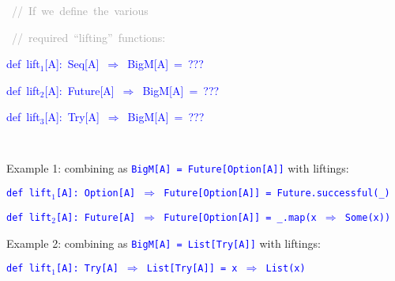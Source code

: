 \begin{minipage}[t]{0.49\columnwidth}%
\begin{lyxcode}
\textcolor{blue}{\footnotesize{}~}\textrm{\textcolor{darkgray}{\footnotesize{}//~If~we~define~the~various}}{\footnotesize\par}

\textrm{\textcolor{darkgray}{\footnotesize{}~//~required~``lifting''~functions:}}{\footnotesize\par}

\textcolor{blue}{\footnotesize{}def~lift$_{1}${[}A{]}:~Seq{[}A{]}~$\Rightarrow$~BigM{[}A{]}~=~???}{\footnotesize\par}

\textcolor{blue}{\footnotesize{}def~lift$_{2}${[}A{]}:~Future{[}A{]}~$\Rightarrow$~BigM{[}A{]}~=~???}{\footnotesize\par}

\textcolor{blue}{\footnotesize{}def~lift$_{3}${[}A{]}:~Try{[}A{]}~$\Rightarrow$~BigM{[}A{]}~=~???~~~}{\footnotesize\par}
\end{lyxcode}
%
\end{minipage}\texttt{\textcolor{blue}{\footnotesize{}\medskip{}
}}{\footnotesize\par}

Example 1: combining as \texttt{\textcolor{blue}{\footnotesize{}BigM{[}A{]}
= Future{[}Option{[}A{]}{]}}} with liftings:

{\footnotesize{}\vspace{-0.4cm}}\texttt{\textcolor{blue}{\footnotesize{}def
lift$_{1}${[}A{]}: Option{[}A{]} $\Rightarrow$ Future{[}Option{[}A{]}{]}
= Future.successful(\_)}}{\footnotesize\par}

\texttt{\textcolor{blue}{\footnotesize{}def lift$_{2}${[}A{]}: Future{[}A{]}
$\Rightarrow$ Future{[}Option{[}A{]}{]} = \_.map(x $\Rightarrow$
Some(x))}}{\footnotesize\par}

{\footnotesize{}\vspace{-0.15cm}}Example 2: combining as \texttt{\textcolor{blue}{\footnotesize{}BigM{[}A{]}
= List{[}Try{[}A{]}{]}}} with liftings:

{\footnotesize{}\vspace{-0.05cm}}\texttt{\textcolor{blue}{\footnotesize{}def
lift$_{1}${[}A{]}: Try{[}A{]} $\Rightarrow$ List{[}Try{[}A{]}{]}
= x $\Rightarrow$ List(x)}}{\footnotesize\par}

